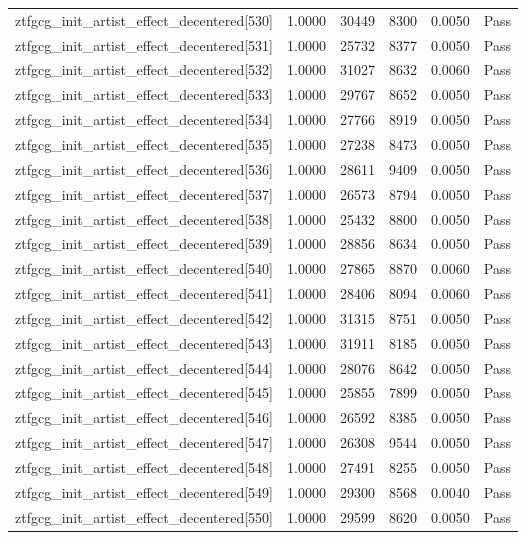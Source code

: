 \begin{table}[htbp]
\begin{tabular}{llrrll}
ztfgcg\_init\_artist\_effect\_decentered[530] & 1.0000 & 30449 & 8300 & 0.0050 & Pass \\
ztfgcg\_init\_artist\_effect\_decentered[531] & 1.0000 & 25732 & 8377 & 0.0050 & Pass \\
ztfgcg\_init\_artist\_effect\_decentered[532] & 1.0000 & 31027 & 8632 & 0.0060 & Pass \\
ztfgcg\_init\_artist\_effect\_decentered[533] & 1.0000 & 29767 & 8652 & 0.0050 & Pass \\
ztfgcg\_init\_artist\_effect\_decentered[534] & 1.0000 & 27766 & 8919 & 0.0050 & Pass \\
ztfgcg\_init\_artist\_effect\_decentered[535] & 1.0000 & 27238 & 8473 & 0.0050 & Pass \\
ztfgcg\_init\_artist\_effect\_decentered[536] & 1.0000 & 28611 & 9409 & 0.0050 & Pass \\
ztfgcg\_init\_artist\_effect\_decentered[537] & 1.0000 & 26573 & 8794 & 0.0050 & Pass \\
ztfgcg\_init\_artist\_effect\_decentered[538] & 1.0000 & 25432 & 8800 & 0.0050 & Pass \\
ztfgcg\_init\_artist\_effect\_decentered[539] & 1.0000 & 28856 & 8634 & 0.0050 & Pass \\
ztfgcg\_init\_artist\_effect\_decentered[540] & 1.0000 & 27865 & 8870 & 0.0060 & Pass \\
ztfgcg\_init\_artist\_effect\_decentered[541] & 1.0000 & 28406 & 8094 & 0.0060 & Pass \\
ztfgcg\_init\_artist\_effect\_decentered[542] & 1.0000 & 31315 & 8751 & 0.0050 & Pass \\
ztfgcg\_init\_artist\_effect\_decentered[543] & 1.0000 & 31911 & 8185 & 0.0050 & Pass \\
ztfgcg\_init\_artist\_effect\_decentered[544] & 1.0000 & 28076 & 8642 & 0.0050 & Pass \\
ztfgcg\_init\_artist\_effect\_decentered[545] & 1.0000 & 25855 & 7899 & 0.0050 & Pass \\
ztfgcg\_init\_artist\_effect\_decentered[546] & 1.0000 & 26592 & 8385 & 0.0050 & Pass \\
ztfgcg\_init\_artist\_effect\_decentered[547] & 1.0000 & 26308 & 9544 & 0.0050 & Pass \\
ztfgcg\_init\_artist\_effect\_decentered[548] & 1.0000 & 27491 & 8255 & 0.0050 & Pass \\
ztfgcg\_init\_artist\_effect\_decentered[549] & 1.0000 & 29300 & 8568 & 0.0040 & Pass \\
ztfgcg\_init\_artist\_effect\_decentered[550] & 1.0000 & 29599 & 8620 & 0.0050 & Pass \\

\end{tabular}
\end{table}
